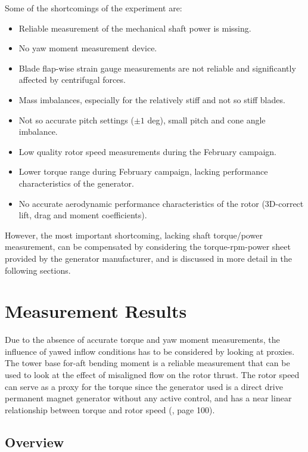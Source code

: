 \documentclass[a4paper]{jpconf}
\begin{document}
Some of the shortcomings of the experiment are:

\begin{itemize}
	\item Reliable measurement of the mechanical shaft power is missing.
	\item No yaw moment measurement device.
	\item Blade flap-wise strain gauge measurements are not reliable and significantly affected by centrifugal forces.
	\item Mass imbalances, especially for the relatively stiff and not so stiff blades.
	\item Not so accurate pitch settings ($\pm 1$ deg), small pitch and cone angle imbalance.
	\item Low quality rotor speed measurements during the February campaign.
	\item Lower torque range during February campaign, lacking performance characteristics of the generator.
	\item No accurate aerodynamic performance characteristics of the rotor (3D-correct lift, drag and moment coefficients).
\end{itemize}

However, the most important shortcoming, lacking shaft torque/power measurement, can be compensated by considering the torque-rpm-power sheet provided by the generator manufacturer, and is discussed in more detail in the following sections.


\section{Measurement Results}

Due to the absence of accurate torque and yaw moment measurements, the influence of yawed inflow conditions has to be considered by looking at proxies. The tower base for-aft bending moment is a reliable measurement that can be used to look at the effect of misaligned flow on the rotor thrust. The rotor speed can serve as a proxy for the torque since the generator used is a direct drive permanent magnet generator without any active control, and has a near linear relationship between torque and rotor speed (\cite{verelst_numerical_2013:diss}, page 100).

\subsection{Overview}
\end{document}
